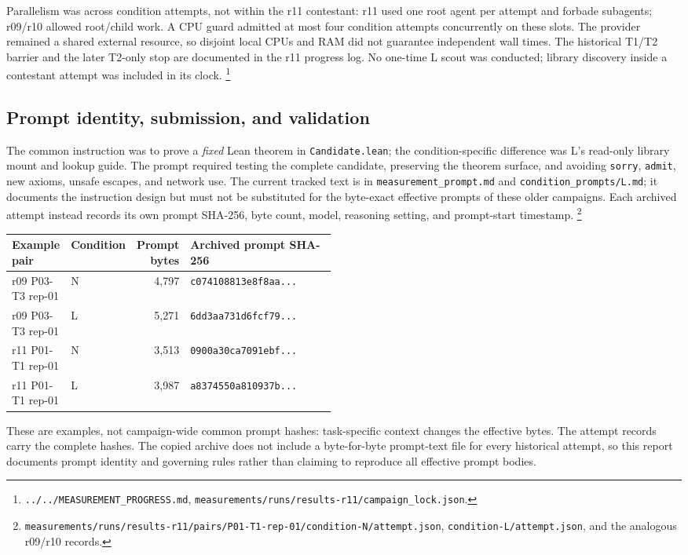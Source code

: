 \documentclass[10pt]{article}
\newcommand{\pathref}[1]{\nolinkurl{#1}}
\begin{document}
Parallelism was across condition attempts, not within the r11 contestant:
r11 used one root agent per attempt and forbade subagents; r09/r10 allowed
root/child work. A CPU guard admitted at most four condition attempts
concurrently on these slots. The provider remained a shared external
resource, so disjoint local CPUs and RAM did not guarantee independent
wall times. The historical T1/T2 barrier and the later T2-only stop are
documented in the r11 progress log. No one-time L scout was conducted;
library discovery inside a contestant attempt was included in its clock.
\footnote{\pathref{../../MEASUREMENT_PROGRESS.md},
\pathref{measurements/runs/results-r11/campaign_lock.json}.}

\subsection*{Prompt identity, submission, and validation}
The common instruction was to prove a \emph{fixed} Lean theorem in
\texttt{Candidate.lean}; the condition-specific difference was L's
read-only library mount and lookup guide. The prompt required testing the
complete candidate, preserving the theorem surface, and avoiding
\texttt{sorry}, \texttt{admit}, new axioms, unsafe escapes, and network use.
The current tracked text is in \pathref{measurement_prompt.md} and
\pathref{condition_prompts/L.md}; it documents the instruction design but
must not be substituted for the byte-exact effective prompts of these
older campaigns. Each archived attempt instead records its own prompt
SHA-256, byte count, model, reasoning setting, and prompt-start timestamp.
\footnote{\pathref{measurements/runs/results-r11/pairs/P01-T1-rep-01/condition-N/attempt.json},
\pathref{condition-L/attempt.json}, and the analogous r09/r10 records.}

\begin{center}\small
\begin{tabular}{@{}llrp{0.48\linewidth}@{}}\toprule
Example pair & Condition & Prompt bytes & Archived prompt SHA-256 \\\midrule
r09 P03-T3 rep-01 & N & 4,797 & \texttt{c074108813e8f8aa...} \\
r09 P03-T3 rep-01 & L & 5,271 & \texttt{6dd3aa731d6fcf79...} \\
r11 P01-T1 rep-01 & N & 3,513 & \texttt{0900a30ca7091ebf...} \\
r11 P01-T1 rep-01 & L & 3,987 & \texttt{a8374550a810937b...} \\
\bottomrule\end{tabular}
\end{center}
These are examples, not campaign-wide common prompt hashes:
task-specific context changes the effective bytes. The attempt records
carry the complete hashes. The copied archive does not include a
byte-for-byte prompt-text file for every historical attempt, so this
report documents prompt identity and governing rules rather than claiming
to reproduce all effective prompt bodies.
\end{document}
